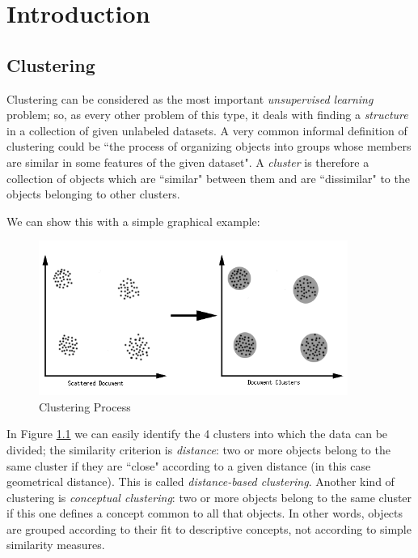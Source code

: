 \chapter{Introduction}\label{intro}

\section{Clustering}
Clustering can be considered as the most important \textit{unsupervised learning} problem;
so, as every other problem of this type, it deals with finding a \textit{structure} in a
collection of given unlabeled datasets. A very common informal definition of clustering could be
``the process of organizing objects into groups whose members are similar in some features of the given dataset".
A \textit{cluster} is therefore a collection of objects which are ``similar" between them and are
``dissimilar" to the objects belonging to other clusters.

We can show this with a simple graphical example:

\begin{figure}[h]
  \centering
  \includegraphics[width=0.9\textwidth]{figures/clustering}
  \caption{Clustering Process}
  \label{fig:clustering}
\end{figure}

In Figure \ref{fig:clustering} we can easily identify the 4 clusters into which the data can be divided; the similarity
criterion is \textit{distance}: two or more objects belong to the same cluster if they are ``close" according to a
given distance (in this case geometrical distance). This is called \textit{distance-based clustering}.
Another kind of clustering is \textit{conceptual clustering}: two or more objects belong to the same cluster
if this one defines a concept common to all that objects. In other words, objects are grouped according
to their fit to descriptive concepts, not according to simple similarity measures.

